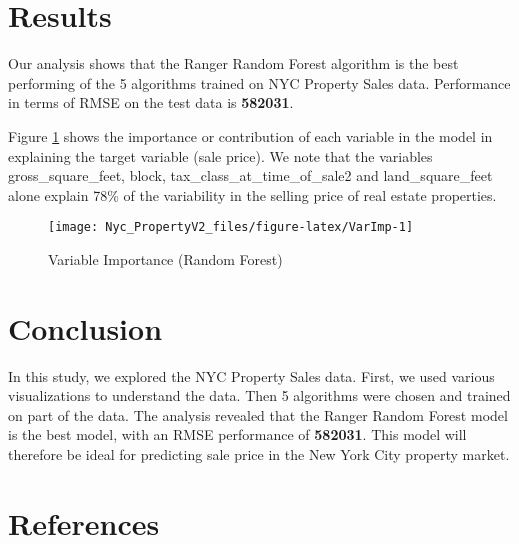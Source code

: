 \documentclass[
]{article}
\begin{document}
\section{Results}\label{results}

Our analysis shows that the Ranger Random Forest algorithm is the best performing of the 5 algorithms trained on NYC Property Sales data. Performance in terms of RMSE on the test data is \textbf{582031}.

Figure \ref{fig:VarImp} shows the importance or contribution of each variable in the model in explaining the target variable (sale price). We note that the variables gross\_square\_feet, block, tax\_class\_at\_time\_of\_sale2 and land\_square\_feet alone explain 78\% of the variability in the selling price of real estate properties.

\begin{table}[H]
\centering
\caption{\label{tab:Modelres2}Performance of the final algorithm.}
\centering
{}
\end{table}

\begin{figure}[H]

{\centering \texttt{[image: Nyc\_PropertyV2\_files/figure-latex/VarImp-1]} 

}

\caption{Variable Importance (Random Forest)}\label{fig:VarImp}
\end{figure}

\section{Conclusion}\label{conclusion}

In this study, we explored the NYC Property Sales data. First, we used various visualizations to understand the data. Then 5 algorithms were chosen and trained on part of the data. The analysis revealed that the Ranger Random Forest model is the best model, with an RMSE performance of \textbf{582031}. This model will therefore be ideal for predicting sale price in the New York City property market.

\section*{References}\label{references}
\end{document}
